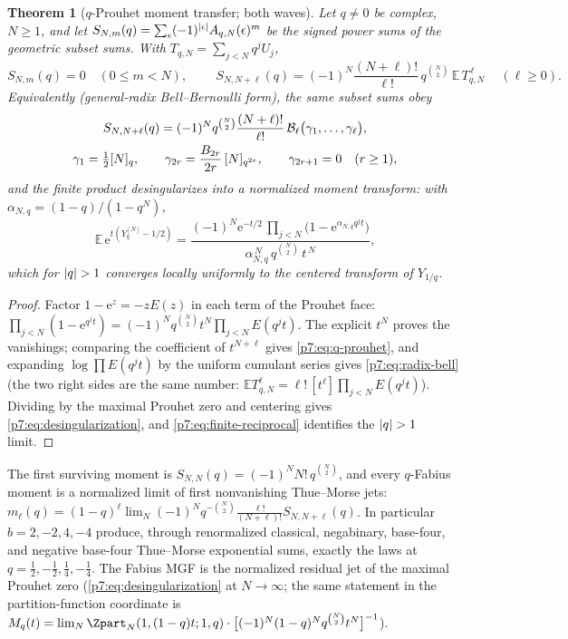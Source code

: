 \documentclass[11pt,oneside]{article}
\numberwithin{equation}{section}
\newtheorem{theorem}{Theorem}[section]
\theoremstyle{definition}
\theoremstyle{remark}
\newcommand{\E}{\mathbb E}
\newcommand{\e}{\mathrm e}
\newcommand{\Bell}{\mathcal B}
\begin{document}
\begin{theorem}[$q$-Prouhet moment transfer; both waves]
\label{p7:thm:q-prouhet}
Let $q\ne0$ be complex, $N\ge1$, and let
$S_{N,m}(q)=\sum_{\epsilon}(-1)^{\left\lvert \epsilon\right\rvert}A_{q,N}(\epsilon)^m$ be the
signed power sums of the geometric subset sums.  With
$T_{q,N}=\sum_{j<N}q^jU_j$,
\begin{equation}\label{p7:eq:q-prouhet}
 S_{N,m}(q)=0\quad(0\le m<N),
 \qquad
 \boxed{\ S_{N,N+\ell}(q)
 =(-1)^N\frac{(N+\ell)!}{\ell!}\,q^{\binom N2}\,
 \E\,T_{q,N}^{\,\ell}\ }
 \quad(\ell\ge0).
\end{equation}
Equivalently (general-radix Bell--Bernoulli form), the same subset sums obey
\begin{gather}
 S_{N,N+\ell}(q)
 =(-1)^Nq^{\binom N2}\frac{(N+\ell)!}{\ell!}\,
 \Bell_\ell\bigl(\gamma_1,\ldots,\gamma_\ell\bigr),
 \label{p7:eq:radix-bell}\\
 \gamma_1=\tfrac12[N]_q,\qquad
 \gamma_{2r}=\frac{B_{2r}}{2r}\,[N]_{q^{2r}},\qquad
 \gamma_{2r+1}=0\quad(r\ge1),\notag
\end{gather}
and the finite product desingularizes into a normalized moment transform:
with $\alpha_{N,q}=(1-q)/(1-q^N)$,
\begin{equation}\label{p7:eq:desingularization}
 \E\,\e^{t\left(Y_q^{[N]}-1/2\right)}
 =\frac{(-1)^N\e^{-t/2}\,
 \prod_{j<N}\bigl(1-\e^{\alpha_{N,q}q^jt}\bigr)}
 {\alpha_{N,q}^{\,N}\,q^{\binom N2}\,t^{\,N}},
\end{equation}
which for $\left\lvert q\right\rvert>1$ converges locally uniformly to the centered transform of
$Y_{1/q}$.
\end{theorem}

\begin{proof}
Factor $1-\e^{z}=-zE(z)$ in each term of the Prouhet face:
$\prod_{j<N}(1-\e^{q^jt})=(-1)^Nq^{\binom N2}t^N\prod_{j<N}E(q^jt)$.  The
explicit $t^N$ proves the vanishings; comparing the coefficient of
$t^{N+\ell}$ gives \eqref{p7:eq:q-prouhet}, and expanding
$\log\prod E(q^jt)$ by the uniform cumulant series gives
\eqref{p7:eq:radix-bell} (the two right sides are the same number:
$\E T_{q,N}^{\ell}=\ell!\,[t^\ell]\prod_{j<N}E(q^jt)$).  Dividing by the
maximal Prouhet zero and centering gives \eqref{p7:eq:desingularization},
and \eqref{p7:eq:finite-reciprocal} identifies the $\left\lvert q\right\rvert>1$ limit.
\end{proof}

The first surviving moment is $S_{N,N}(q)=(-1)^NN!\,q^{\binom N2}$, and every
$q$-Fabius moment is a normalized limit of first nonvanishing Thue--Morse
jets:
$m_\ell(q)=(1-q)^\ell\lim_N(-1)^Nq^{-\binom N2}
\tfrac{\ell!}{(N+\ell)!}S_{N,N+\ell}(q)$.  In particular
$b=2,-2,4,-4$ produce, through renormalized classical, negabinary, base-four,
and negative base-four Thue--Morse exponential sums, exactly the laws at
$q=\tfrac12,-\tfrac12,\tfrac14,-\tfrac14$.  The Fabius MGF is the normalized
residual jet of the maximal Prouhet zero
(\cref{p7:eq:desingularization} at $N\to\infty$; the same statement in the
partition-function coordinate is
$M_q(t)=\lim_N\Zpart_N(1,(1-q)t;1,q)\cdot
\bigl[(-1)^N(1-q)^Nq^{\binom N2}t^N\bigr]^{-1}$).
\end{document}

